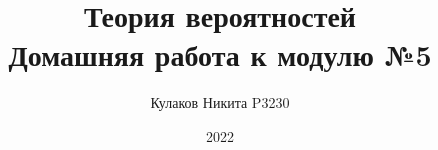 
\title{Теория вероятностей\\ Домашняя работа к модулю №5}
\date{2022}
\author{Кулаков Никита P3230}



\maketitle

\begin{sloppypar}
\tableofcontents
\newpage


\end{sloppypar}



